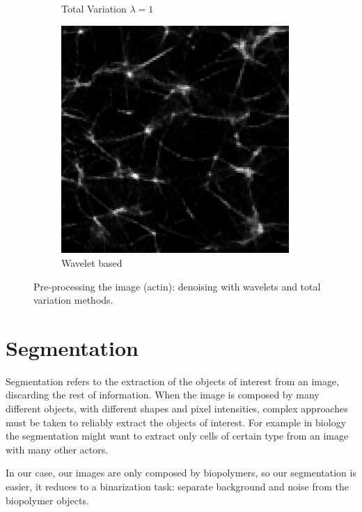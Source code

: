 \begin{figure}[!htb]
\begin{subfigure}{0.33\textwidth}
    \caption{Total Variation $\lambda = 1$}
    \label{subfig:denoise_tv}
  \end{subfigure}%
  \begin{subfigure}{0.33\textwidth}
    \centering
    \includegraphics[width=0.95\textwidth]{Figures/chapter-image/denoise_actin1_wavelet.png}%
    \caption{Wavelet based}
    \label{subfig:denoise_wavelet}
  \end{subfigure}
  \caption{Pre-processing the image (actin): denoising with wavelets and total variation methods.}
  \label{fig:denoise}
\end{figure}


\section{Segmentation}
\label{sec:segmentation}

Segmentation refers to the extraction of the objects of interest from an image, discarding the rest of information. When the image is composed by many different objects, with different shapes and pixel
intensities, complex approaches must be taken to reliably extract the objects of interest.
For example in biology the segmentation might want to extract only cells of certain type from an
image with many other actors.

In our case, our images are only composed by biopolymers, so our segmentation is easier, it reduces
to a binarization task: separate background and noise from the biopolymer objects.

